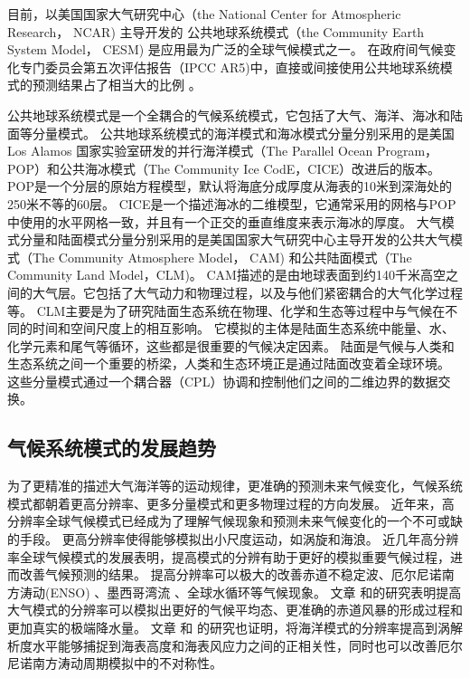  
目前，以美国国家大气研究中心（the National Center for Atmospheric Research， NCAR) 主导开发的
公共地球系统模式（the Community Earth System Model， CESM) 是应用最为广泛的全球气候模式之一\cite{hurrell2013community}。
在政府间气候变化专门委员会第五次评估报告（IPCC AR5)中，直接或间接使用公共地球系统模式的预测结果占了相当大的比例 \cite{stocker2013ipcc}。
 

公共地球系统模式是一个全耦合的气候系统模式，它包括了大气、海洋、海冰和陆面等分量模式。
公共地球系统模式的海洋模式和海冰模式分量分别采用的是美国Los Alamos 国家实验室研发的并行海洋模式（The Parallel Ocean Program，POP）和公共海冰模式（The Community Ice CodE，CICE）改进后的版本\cite{hurrell2013community}。
POP是一个分层的原始方程模型，默认将海底分成厚度从海表的10米到深海处的250米不等的60层。
CICE是一个描述海冰的二维模型，它通常采用的网格与POP中使用的水平网格一致，并且有一个正交的垂直维度来表示海冰的厚度。 
大气模式分量和陆面模式分量分别采用的是美国国家大气研究中心主导开发的公共大气模式（The Community Atmosphere Model， CAM) 和公共陆面模式（The Community Land Model，CLM)。 
CAM描述的是由地球表面到约140千米高空之间的大气层。它包括了大气动力和物理过程，以及与他们紧密耦合的大气化学过程等。
CLM主要是为了研究陆面生态系统在物理、化学和生态等过程中与气候在不同的时间和空间尺度上的相互影响。
它模拟的主体是陆面生态系统中能量、水、化学元素和尾气等循环，这些都是很重要的气候决定因素。
陆面是气候与人类和生态系统之间一个重要的桥梁，人类和生态环境正是通过陆面改变着全球环境。
这些分量模式通过一个耦合器（CPL）协调和控制他们之间的二维边界的数据交换。

 

\subsection{气候系统模式的发展趋势}

为了更精准的描述大气海洋等的运动规律，更准确的预测未来气候变化，气候系统模式都朝着更高分辨率、更多分量模式和更多物理过程的方向发展。
近年来，高分辨率全球气候模式已经成为了理解气候现象和预测未来气候变化的一个不可或缺的手段。
更高分辨率使得能够模拟出小尺度运动，如涡旋和海浪。 
近几年高分辨率全球气候模式的发展表明，提高模式的分辨有助于更好的模拟重要气候过程，进而改善气候预测的结果。
提高分辨率可以极大的改善赤道不稳定波\citep{roberts2009impact}、厄尔尼诺南方涛动(ENSO) \citep{shaffrey2009uk}、墨西哥湾流\citep{chassignet2008gulf, kuwano2010precipitation} 、全球水循环\citep{demory2014role}等气候现象。
文章 和的研究表明提高大气模式的分辨率可以模拟出更好的气候平均态、更准确的赤道风暴的形成过程和更加真实的极端降水量。
文章 和 的研究也证明，将海洋模式的分辨率提高到涡解析度水平能够捕捉到海表高度和海表风应力之间的正相关性，同时也可以改善厄尔尼诺南方涛动周期模拟中的不对称性。



